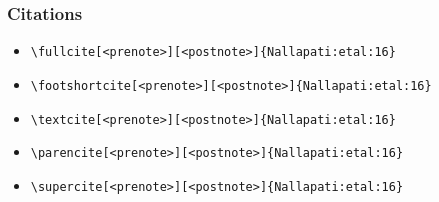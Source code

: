\begin{frame}[fragile]
  \frametitle{Citations}


\begin{itemize}
\item \verb|\fullcite[<prenote>][<postnote>]{Nallapati:etal:16}| \newline  {}
\item \verb|\footshortcite[<prenote>][<postnote>]{Nallapati:etal:16}| \newline  {}
\item \verb|\textcite[<prenote>][<postnote>]{Nallapati:etal:16}| \newline \textcite[<prenote>][<postnote>]{Nallapati:etal:16}
\item \verb|\parencite[<prenote>][<postnote>]{Nallapati:etal:16}| \newline \parencite[<prenote>][<postnote>]{Nallapati:etal:16}
\item \verb|\supercite[<prenote>][<postnote>]{Nallapati:etal:16}| \newline \supercite[<prenote>][<postnote>]{Nallapati:etal:16}

\end{itemize}
\end{frame}
